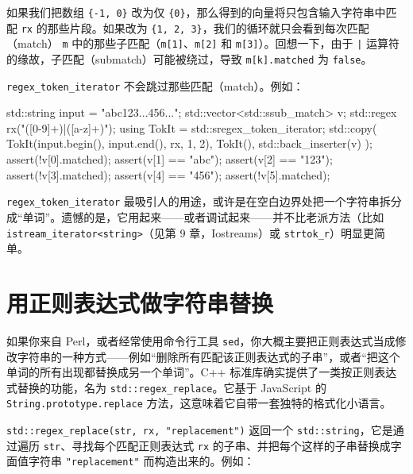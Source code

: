 如果我们把数组 \texttt{\{-1,\allowbreak{} 0\}} 改为仅 \texttt{\{0\}}，那么得到的向量将只包含输入字符串中匹配 \texttt{rx} 的那些片段。如果改为 \texttt{\{1,\allowbreak{} 2,\allowbreak{} 3\}}，我们的循环就只会看到每次匹配（match） \texttt{m} 中的那些子匹配（\texttt{m[1]}、\texttt{m[2]} 和 \texttt{m[3]}）。回想一下，由于 \texttt{|} 运算符的缘故，子匹配（submatch）可能被绕过，导致 \texttt{m[k].matched} 为 \texttt{false}。

\texttt{regex\_\allowbreak{}token\_\allowbreak{}iterator} 不会跳过那些匹配（match）。例如：

\begin{codebox}[cpp]
    std::string input = "abc123...456...";
    std::vector<std::ssub_match> v;
    std::regex rx("([0-9]+)|([a-z]+)");
    using TokIt = std::sregex_token_iterator;
    std::copy(
      TokIt(input.begin(), input.end(), rx, {1, 2}),
      TokIt(),
      std::back_inserter(v)
    );
    assert(!v[0].matched); assert(v[1] == "abc");
    assert(v[2] == "123"); assert(!v[3].matched);
    assert(v[4] == "456"); assert(!v[5].matched);
\end{codebox}

\texttt{regex\_\allowbreak{}token\_\allowbreak{}iterator} 最吸引人的用途，或许是在空白边界处把一个字符串拆分成“单词”。遗憾的是，它用起来——或者调试起来——并不比老派方法（比如 \texttt{istream\_\allowbreak{}iterator<\allowbreak{}string>\allowbreak{}}（见第 9 章，Iostreams）或 \texttt{strtok\_\allowbreak{}r}）明显更简单。

\section{用正则表达式做字符串替换}

如果你来自 Perl，或者经常使用命令行工具 \texttt{sed}，你大概主要把正则表达式当成修改字符串的一种方式——例如“删除所有匹配该正则表达式的子串”，或者“把这个单词的所有出现都替换成另一个单词”。C++ 标准库确实提供了一类按正则表达式替换的功能，名为 \texttt{std::\allowbreak{}regex\_\allowbreak{}replace}。它基于 JavaScript 的 \texttt{String.\allowbreak{}prototype.\allowbreak{}replace} 方法，这意味着它自带一套独特的格式化小语言。

\texttt{std::\allowbreak{}regex\_\allowbreak{}replace(\allowbreak{}str,\allowbreak{} rx,\allowbreak{} "replacement")\allowbreak{}} 返回一个 \texttt{std::\allowbreak{}string}，它是通过遍历 \texttt{str}、寻找每个匹配正则表达式 \texttt{rx} 的子串、并把每个这样的子串替换成字面值字符串 \texttt{"replacement"} 而构造出来的。例如：

